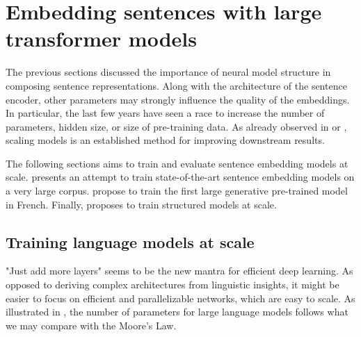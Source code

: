 \chapter{Embedding sentences with large transformer models}


The previous sections discussed the importance of neural model structure in composing sentence representations. Along with the architecture of the sentence encoder, other parameters may strongly influence the quality of the embeddings. In particular, the last few years have seen a race to increase the number of parameters, hidden size, or size of pre-training data. As already observed in  or , scaling models is an established method for improving downstream results.

The following sections aims to train and evaluate sentence embedding models at scale.  presents an attempt to train state-of-the-art sentence embedding models on a very large corpus.  propose to train the first large generative pre-trained model in French. Finally,  proposes to train structured models at scale.

\section{Training language models at scale}

"Just add more layers" seems to be the new mantra for efficient deep learning. As opposed to deriving complex architectures from linguistic insights, it might be easier to focus on efficient and parallelizable networks, which are easy to scale. As illustrated in , the number of parameters for large language models follows what we may compare with the Moore's Law.

